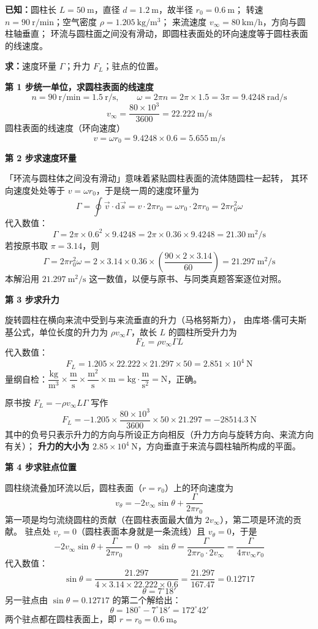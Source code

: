 \begin{jie}
\textbf{已知：}圆柱长 $L=50\ \mathrm{m}$，直径 $d=1.2\ \mathrm{m}$，故半径 $r_0=0.6\ \mathrm{m}$；
转速 $n=90\ \mathrm{r/min}$；空气密度 $\rho=1.205\ \mathrm{kg/m^3}$；
来流速度 $v_\infty=80\ \mathrm{km/h}$，方向与圆柱轴垂直；
环流与圆柱面之间没有滑动，即圆柱表面处的环向速度等于圆柱表面的线速度。

\textbf{求：}速度环量 $\Gamma$；升力 $F_L$；驻点的位置。

\textbf{第 1 步\quad 统一单位，求圆柱表面的线速度}
\[ n=90\ \mathrm{r/min}=1.5\ \mathrm{r/s},\qquad
   \omega=2\pi n=2\pi\times1.5=3\pi=9.4248\ \mathrm{rad/s} \]
\[ v_\infty=\frac{80\times10^3}{3600}=22.222\ \mathrm{m/s} \]
圆柱表面的线速度（环向速度）
\[ v=\omega r_0=9.4248\times0.6=5.655\ \mathrm{m/s} \]

\textbf{第 2 步\quad 求速度环量}

「环流与圆柱体之间没有滑动」意味着紧贴圆柱表面的流体随圆柱一起转，
其环向速度处处等于 $v=\omega r_0$，于是绕一周的速度环量为
\[ \Gamma=\oint\vec{v}\cdot\mathrm{d}\vec{s}=v\cdot 2\pi r_0=\omega r_0\cdot 2\pi r_0=2\pi r_0^2\omega \]
代入数值：
\[ \Gamma=2\pi\times0.6^2\times9.4248=2\pi\times0.36\times9.4248=21.30\ \mathrm{m^2/s} \]
若按原书取 $\pi=3.14$，则
\[ \Gamma=2\pi r_0^2\omega=2\times3.14\times0.36\times\left(\frac{90\times2\times3.14}{60}\right)
 =21.297\ \mathrm{m^2/s} \]
本解沿用 $21.297\ \mathrm{m^2/s}$ 这一数值，以便与原书、与同类真题答案逐位对照。

\textbf{第 3 步\quad 求升力}

旋转圆柱在横向来流中受到与来流垂直的升力（马格努斯力），
由库塔-儒可夫斯基公式，单位长度的升力为 $\rho v_\infty\Gamma$，故长 $L$ 的圆柱所受升力为
\[ F_L=\rho v_\infty\Gamma L \]
代入数值：
\[ F_L=1.205\times22.222\times21.297\times50=2.851\times10^4\ \mathrm{N} \]
量纲自检：$\mathrm{\dfrac{kg}{m^3}\times\dfrac{m}{s}\times\dfrac{m^2}{s}\times m}=\mathrm{kg\cdot\dfrac{m}{s^2}}=\mathrm{N}$，正确。

原书按 $F_L=-\rho v_\infty L\Gamma$ 写作
\[ F_L=-1.205\times\frac{80\times10^3}{3600}\times50\times21.297=-28514.3\ \mathrm{N} \]
其中的负号只表示升力的方向与所设正方向相反（升力方向与旋转方向、来流方向有关）；
\textbf{升力的大小为 $2.85\times10^4\ \mathrm{N}$}，方向垂直于来流与圆柱轴所构成的平面。

\textbf{第 4 步\quad 求驻点位置}

圆柱绕流叠加环流以后，圆柱表面（$r=r_0$）上的环向速度为
\[ v_\theta=-2v_\infty\sin\theta+\frac{\Gamma}{2\pi r_0} \]
第一项是均匀流绕圆柱的贡献（在圆柱表面最大值为 $2v_\infty$），第二项是环流的贡献。
驻点处 $v_r=0$（圆柱表面本身就是一条流线）且 $v_\theta=0$，于是
\[ -2v_\infty\sin\theta+\frac{\Gamma}{2\pi r_0}=0
 \ \Longrightarrow\
 \sin\theta=\frac{\Gamma}{2\pi r_0\cdot 2v_\infty}=\frac{\Gamma}{4\pi v_\infty r_0} \]
代入数值：
\[ \sin\theta=\frac{21.297}{4\times3.14\times22.222\times0.6}=\frac{21.297}{167.47}=0.12717 \]
\[ \theta=7^\circ18' \]
另一驻点由 $\sin\theta=0.12717$ 的第二个解给出：
\[ \theta=180^\circ-7^\circ18'=172^\circ42' \]
两个驻点都在圆柱表面上，即 $r=r_0=0.6\ \mathrm{m}$。


\end{jie}
